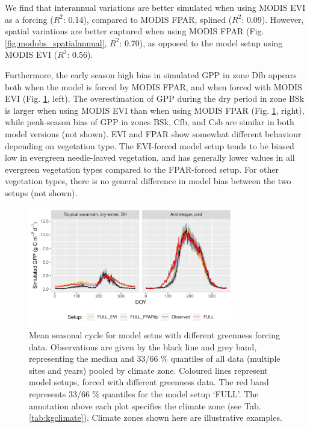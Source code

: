 \documentclass{myreport}
\newcommand{\rsq}{$R^2$}
\begin{document}
We find that interannual variations are better simulated when using MODIS EVI as a forcing (\rsq : 0.14), compared to MODIS FPAR, splined (\rsq : 0.09). However, spatial variations are better captured when using MODIS FPAR (Fig. \ref{fig:modobs_spatialannual}, \rsq : 0.70), as opposed to the model setup using MODIS EVI (\rsq : 0.56). 

Furthermore, the early season high bias in simulated GPP in zone Dfb appears both when the model is forced by MODIS FPAR, and when forced with MODIS EVI (Fig. \ref{fig:season_greenness}, left). The overestimation of GPP during the dry period in zone BSk is larger when using MODIS EVI than when using MODIS FPAR (Fig. \ref{fig:season_greenness}, right), while peak-season bias of GPP in zones BSk, Cfb, and Csb are similar in both model versions (not shown). EVI and FPAR show somewhat different behaviour depending on vegetation type. The EVI-forced model setup tends to be biased low in evergreen needle-leaved vegetation, and has generally lower values in all evergreen vegetation types compared to the FPAR-forced setup. For other vegetation types, there is no general difference in model bias between the two setups (not shown).

 \begin{figure}[!ht]
    \centering
\includegraphics[width=0.8\textwidth]{fig/meandoy_byzone_greenness.pdf}
    \caption{Mean seasonal cycle for model setus with different greenness forcing data. Observations are given by the black line and grey band, representing the median and 33/66 \% quantiles of all data (multiple sites and years) pooled by climate zone. Coloured lines represent model setups, forced with different greenness data. The red band represents 33/66 \% quantiles for the model setup `FULL'. The annotation above each plot specifies the climate zone (see Tab. \ref{tab:kgclimate}). Climate zones shown here are illustrative examples.}
    \label{fig:season_greenness}
\end{figure}
\end{document}

